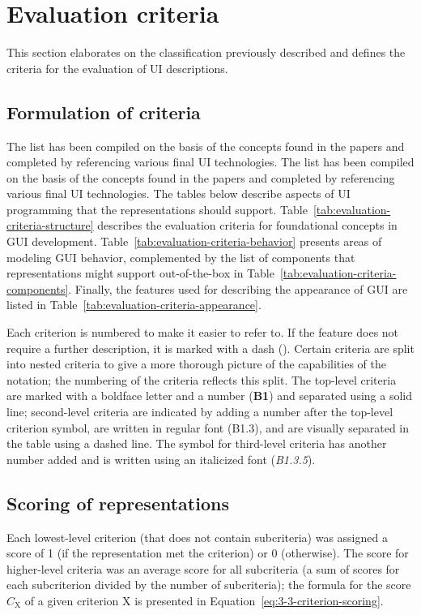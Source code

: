 \section{Evaluation criteria}\label{sec:evaluation-criteria}

This section elaborates on the classification previously described and defines the criteria for the evaluation of UI descriptions.

\subsection{Formulation of criteria}\label{subsec:formulation-of-criteria}
The list has been compiled on the basis of the concepts found in the papers and completed by referencing various final UI technologies.
The list has been compiled on the basis of the concepts found in the papers and completed by referencing various final UI technologies.
The tables below describe aspects of UI programming that the representations should support.
Table~\ref{tab:evaluation-criteria-structure} describes the evaluation criteria for foundational concepts in GUI development.
Table~\ref{tab:evaluation-criteria-behavior} presents areas of modeling GUI behavior, complemented by the list of components that representations might support out-of-the-box in Table~\ref{tab:evaluation-criteria-components}.
Finally, the features used for describing the appearance of GUI are listed in Table~\ref{tab:evaluation-criteria-appearance}.

Each criterion is numbered to make it easier to refer to.
If the feature does not require a further description, it is marked with a dash (\textemdash).
Certain criteria are split into nested criteria to give a more thorough picture of the capabilities of the notation;
the numbering of the criteria reflects this split.
The top-level criteria are marked with a boldface letter and a number (\textbf{B1}) and separated using a solid line;
second-level criteria are indicated by adding a number after the top-level criterion symbol, are written in regular font (B1.3), and are visually separated in the table using a dashed line.
The symbol for third-level criteria has another number added and is written using an italicized font (\textit{B1.3.5}).

\subsection{Scoring of representations}\label{subsec:scoring-of-representations}
Each lowest-level criterion (that does not contain subcriteria) was assigned a score of 1 (if the representation met the criterion) or 0 (otherwise).
The score for higher-level criteria was an average score for all subcriteria (a sum of scores for each subcriterion divided by the number of subcriteria);
the formula for the score $C_\text{X}$ of a given criterion X is presented in Equation~\ref{eq:3-3-criterion-scoring}.

